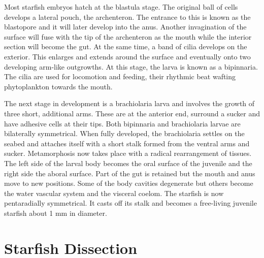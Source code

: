 \documentclass[]{book}
\theoremstyle{definition}
\theoremstyle{definition}
\theoremstyle{definition}
\theoremstyle{remark}
\begin{document}
Most starfish embryos hatch at the blastula stage. The original ball of
cells develops a lateral pouch, the archenteron. The entrance to this is
known as the blastopore and it will later develop into the anus. Another
invagination of the surface will fuse with the tip of the archenteron as
the mouth while the interior section will become the gut. At the same
time, a band of cilia develops on the exterior. This enlarges and
extends around the surface and eventually onto two developing arm-like
outgrowths. At this stage, the larva is known as a bipinnaria. The cilia
are used for locomotion and feeding, their rhythmic beat wafting
phytoplankton towards the mouth.

The next stage in development is a brachiolaria larva and involves the
growth of three short, additional arms. These are at the anterior end,
surround a sucker and have adhesive cells at their tips. Both bipinnaria
and brachiolaria larvae are bilaterally symmetrical. When fully
developed, the brachiolaria settles on the seabed and attaches itself
with a short stalk formed from the ventral arms and sucker.
Metamorphosis now takes place with a radical rearrangement of tissues.
The left side of the larval body becomes the oral surface of the
juvenile and the right side the aboral surface. Part of the gut is
retained but the mouth and anus move to new positions. Some of the body
cavities degenerate but others become the water vascular system and the
visceral coelom. The starfish is now pentaradially symmetrical. It casts
off its stalk and becomes a free-living juvenile starfish about 1 mm in
diameter.

\section{Starfish Dissection}\label{perform-starfish-dissection}
\end{document}
